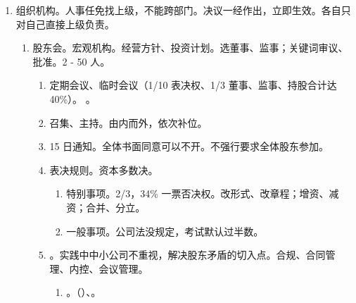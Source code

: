 \begin{enumerate}
\begin{enumerate}
\begin{enumerate}
                \end{enumerate}
          \item 异议股东/小股东的回购请求权。异议 = 投反对票。股权退给公司，公司把钱退给股东。协商前置。
                \begin{enumerate}
                  \item 5 年营利，5 年不分。题目打时间差。。
                  \item 合并、分立；转让主要财产。。
                  \item 公司死翘翘，要改章程使公司继续存续。不要和公司僵局混。
                  \item 就这 3 种情况。
                \end{enumerate}
        \end{enumerate}
  \item 组织机构。人事任免找上级，不能跨部门。\yi 决议一经作出，立即生效。\er 各自只对自己直接上级负责。
        \begin{enumerate}
          \item 股东会。宏观机构。经营方针、投资计划。选董事、监事；关键词审议、批准。2 - 50 人。
                \begin{enumerate}
                  \item 定期会议、临时会议（1/10 表决权、1/3 董事、监事、持股合计达 40\%）。
                        。
                  \item 召集、主持。由内而外，依次补位。
                  \item 15 日通知。全体书面同意可以不开。不强行要求全体股东参加。
                  \item 表决规则。资本多数决。
                        \begin{enumerate}
                          \item 特别事项。2/3，34\% 一票否决权。改形式、改章程；增资、减资；合并、分立。
                          \item 一般事项。公司法没规定，考试默认过半数。
                        \end{enumerate}
                  \item {}。实践中中小公司不重视，解决股东矛盾的切入点。合规、合同管理、内控、会议管理。
                        \begin{enumerate}
                          \item {}。（）、。

\end{enumerate}
\end{enumerate}
\end{enumerate}
\end{enumerate}
